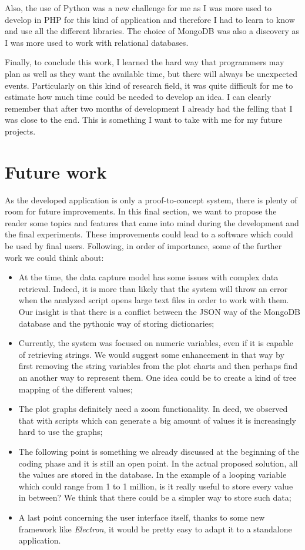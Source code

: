 Also, the use of Python was a new challenge for me as I was more used to develop in PHP for this kind of application and therefore I had to learn to know and use all the different libraries. The choice of MongoDB was also a discovery as I was more used to work with relational databases.

Finally, to conclude this work, I learned the hard way that programmers may plan as well as they want the available time, but there will always be unexpected events. Particularly on this kind of research field, it was quite difficult for me to estimate how much time could be needed to develop an idea. I can clearly remember that after two months of development I already had the felling that I was close to the end. This is something I want to take with me for my future projects.

\section{Future work}
As the developed application is only a proof-to-concept system, there is plenty of room for future improvements. In this final section, we want to propose the reader some topics and features that came into mind during the development and the final experiments. These improvements could lead to a software which could be used by final users. Following, in order of importance, some of the further work we could think about:
\begin{itemize}
  \item At the time, the data capture model has some issues with complex data retrieval. Indeed, it is more than likely that the system will throw an error when the analyzed script opens large text files in order to work with them. Our insight is that there is a conflict between the JSON way of the MongoDB database and the pythonic way of storing dictionaries;
  \item Currently, the system was focused on numeric variables, even if it is capable of retrieving strings. We would suggest some enhancement in that way by first removing the string variables from the plot charts and then perhaps find an another way to represent them. One idea could be to create a kind of tree mapping of the different values;
  \item The plot graphs definitely need a zoom functionality. In deed, we observed that with scripts which can generate a big amount of values it is increasingly hard to use the graphs; 
  \item The following point is something we already discussed at the beginning of the coding phase and it is still an open point. In the actual proposed solution, all the values are stored in the database. In the example of a looping variable which could range from 1 to 1 million, is it really useful to store every value in between? We think that there could be a simpler way to store such data;
  \item A last point concerning the user interface itself, thanks to some new framework like \textit{Electron}, it would be pretty easy to adapt it to a standalone application.
\end{itemize}
  
